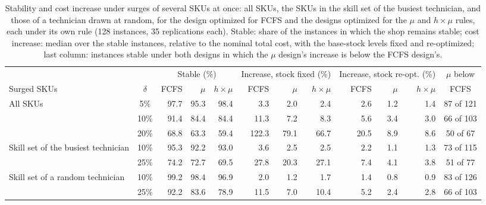 \begin{table}[!htb]
\centering
\caption{Stability and cost increase under surges of several SKUs at once: all SKUs, the SKUs in the skill set of the busiest technician, and those of a technician drawn at random, for the design optimized for FCFS and the designs optimized for the $\mu$ and $h\times\mu$ rules, each under its own rule (128 instances, 35 replications each). Stable: share of the instances in which the shop remains stable; cost increase: median over the stable instances, relative to the nominal total cost, with the base-stock levels fixed and re-optimized; last column: instances stable under both designs in which the $\mu$ design's increase is below the FCFS design's.}
\label{tab:multi_surges}
\small
\setlength{\tabcolsep}{3.5pt}
\begin{tabular}{@{}lc rrr rrr rrr c@{}}
\toprule
& & \multicolumn{3}{c}{Stable (\%)} & \multicolumn{3}{c}{Increase, stock fixed (\%)} & \multicolumn{3}{c}{Increase, stock re-opt. (\%)} & $\mu$ below \\
\cmidrule(lr){3-5}\cmidrule(lr){6-8}\cmidrule(lr){9-11}
Surged SKUs & $\delta$ & FCFS & $\mu$ & $h\times\mu$ & FCFS & $\mu$ & $h\times\mu$ & FCFS & $\mu$ & $h\times\mu$ & FCFS \\
\midrule
All SKUs & 5\% & 97.7 & 95.3 & 98.4 & 3.3 & 2.0 & 2.4 & 2.6 & 1.2 & 1.4 & 87 of 121 \\
 & 10\% & 91.4 & 84.4 & 84.4 & 11.3 & 7.2 & 8.3 & 5.6 & 3.4 & 3.0 & 66 of 103 \\
 & 20\% & 68.8 & 63.3 & 59.4 & 122.3 & 79.1 & 66.7 & 20.5 & 8.9 & 8.6 & 50 of 67 \\
\midrule
Skill set of the busiest technician & 10\% & 95.3 & 92.2 & 93.0 & 3.6 & 2.5 & 2.5 & 2.2 & 1.1 & 1.3 & 73 of 115 \\
 & 25\% & 74.2 & 72.7 & 69.5 & 27.8 & 20.3 & 27.1 & 7.4 & 4.1 & 3.8 & 51 of 77 \\
\midrule
Skill set of a random technician & 10\% & 99.2 & 98.4 & 96.9 & 2.0 & 1.2 & 1.7 & 1.4 & 0.8 & 0.9 & 83 of 126 \\
 & 25\% & 92.2 & 83.6 & 78.9 & 11.5 & 7.0 & 10.4 & 5.2 & 2.4 & 2.8 & 66 of 103 \\
\bottomrule
\end{tabular}
\end{table}
